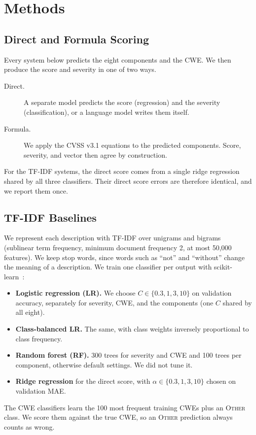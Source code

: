 \section{Methods}\label{sec:methods}

\subsection{Direct and Formula Scoring}
Every system below predicts the eight components and the CWE.
We then produce the score and severity in one of two ways.
\begin{description}
  \item[Direct.] A separate model predicts the score (regression) and the severity (classification), or a language model writes them itself.
  \item[Formula.] We apply the CVSS v3.1 equations to the predicted components. Score, severity, and vector then agree by construction.
\end{description}
For the TF-IDF systems, the direct score comes from a single ridge regression shared by all three classifiers.
Their direct score errors are therefore identical, and we report them once.

\subsection{TF-IDF Baselines}
We represent each description with TF-IDF over unigrams and bigrams (sublinear term frequency, minimum document frequency 2, at most 50,000 features). We keep stop words, since words such as ``not'' and ``without'' change the meaning of a description.
We train one classifier per output with scikit-learn~\citep{pedregosa2011sklearn}:
\begin{itemize}
  \item \textbf{Logistic regression (LR).} We choose $C \in \{0.3, 1, 3, 10\}$ on validation accuracy, separately for severity, CWE, and the components (one $C$ shared by all eight).
  \item \textbf{Class-balanced LR.} The same, with class weights inversely proportional to class frequency.
  \item \textbf{Random forest (RF).} 300 trees for severity and CWE and 100 trees per component, otherwise default settings. We did not tune it.
  \item \textbf{Ridge regression} for the direct score, with $\alpha \in \{0.3, 1, 3, 10\}$ chosen on validation MAE.
\end{itemize}
The CWE classifiers learn the 100 most frequent training CWEs plus an \textsc{Other} class.
We score them against the true CWE, so an \textsc{Other} prediction always counts as wrong.

